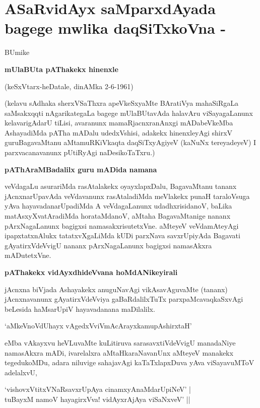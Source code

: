 \chapter{ASaRvidAyx saMparxdAyada bagege mwlika daqSiTxkoVna - }

\begin{center}
BUmike

\textbf{mUlaBUta pAThakekx hinenxle}

(keSxVtarx-heDatale, dinAMka 2-6-1961)
\end{center}

(kelavu sAdhaka sherxVSaThxra apeVkeSxyaMte BAratiVya mahaSiRgaLa saMsakxqqti nAgarikategaLa bagege mUlaBUtavAda halavAru viSayagaLanunx kelavarigAdarU tiLisi, avaranunx mamaRjacnxranAnxgi mADabeVkeMba AshayadiMda pATha mADalu udedxVshisi, adakekx hinenxleyAgi shirxV guruBagavaMtanu aMtamuRKiVkaqta daqSiTxyAgiyeV (kaNuNx tereyadeyeV) I parxvacanavanunx pUtiRyAgi naDesikoTaTxru.)

\noindent
\textbf{pAThAraMBadalilx guru mADida namana}\label{page64}

veVdagaLu asurariMda rasAtalakekx oyayxlapxDalu, BagavaMtanu tananx jAcnxnarUpavAda veVdavanunx rasAtaladiMda meVlakekx punaH taraloVsuga yAva hayavadanarUpadiMda A veVdagaLanunx udadhxrisidanoV, baLika matAsxyXvatAradiMda horataMdanoV, aMtaha BagavaMtanige nananx pArxNagaLanunx bagigxsi namasakxrisutetxVne. aMteyeV veVdamAteyAgi ipapxtatxnAlukx tatatxvXgaLiMda kUDi parxNava savxrUpiyAda Bagavati gAyatirxVdeVvigU nananx pArxNagaLanunx bagigxsi namasAkxra mADutetxVne.

\noindent
\textbf{pAThakekx vidAyxdhideVvana hoMdANikeyirali}\label{page64}

jAcnxna biVjada Ashayakekx anuguNavAgi vikAsavAguvaMte (tananx) jAcnxnavanunx gAyatirxVdeVviya gaBaRdalilxTuTx parxpaMcavaqkaSxvAgi beLesida haMsarUpiV hayavadanana maDilalilx.

\begin{shloka}
`aMkeVnoVdUhayx vAgedxVviVmAcArayxkamupAshirxtaH'\label{page64, 84}
\end{shloka} 

eMba vAkayxvu heVLuvaMte kuLitiruva sarasavxtiVdeVvigU manadaNiye namasAkxra mADi, ivarelalxra aMtaHkaraNavanUnx aMteyeV manakekx tegedukoMDu, adara niluvige sahajavAgi kaTaTxlapxDuva yAva viSayavuMToV adelalxvU, 

\begin{shloka}
`vishovxVtitxVNaRsavxrUpAya cinamxyAnaMdarUpiNeV' |\\\label{65}
tuBayxM namoV hayagirxVva! vidAyxrAjAya viSaNxveV' ||
\end{shloka}

